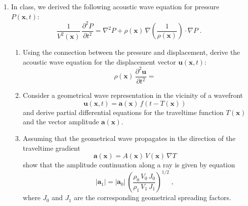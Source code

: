 \begin{enumerate}

\item In class, we derived the following acoustic wave equation for
  pressure $P(\mathbf{x},t)$:
\begin{equation}
{\frac{1}{V^2(\mathbf{x})}}\,{\frac{\partial^2 P}{\partial t^2}} =\nabla^2 P + 
\rho(\mathbf{x})\,
\nabla\left(\frac{1}{\rho(\mathbf{x})}\right) \cdot \nabla P\;.
\label{eq:pwave}
\end{equation}
\begin{enumerate}
\item Using the connection between the pressure and displacement, derive the
acoustic wave equation for the displacement vector
$\mathbf{u}(\mathbf{x},t)$:
\begin{equation}
  \label{eq:uwave}
  \rho(\mathbf{x})\,\frac{\partial^2 \mathbf{u}}{\partial t^2} =
\end{equation}

\item Consider a geometrical wave representation in the vicinity of a wavefront
\begin{equation}
  {\mathbf{u}(\mathbf{x},t)} = \mathbf{a}(\mathbf{x})\,f\left(t-T(\mathbf{x})\right)
  \label{eq:gwave}
\end{equation}
and derive partial differential equations for the traveltime function
$T(\mathbf{x})$ and the vector amplitude $\mathbf{a}(\mathbf{x})$.

\item Assuming that the geometrical wave propagates in the direction
  of the traveltime gradient
\begin{equation}
  {\mathbf{a}(\mathbf{x})} = A(\mathbf{x})\,V(\mathbf{x})\,\nabla T
  \label{eq:vamp}
\end{equation}
show that the amplitude continuation along a ray is given by equation 
\begin{equation}
  \label{eq:avj}
  \left|\mathbf{a}_1\right| = \left|\mathbf{a}_0\right|\,
  \left(\frac{\rho_0\,V_0\,J_0}{\rho_1\,V_1\,J_1}\right)^{1/2}\;, 
\end{equation}
where $J_0$ and $J_1$ are the corresponding geometrical spreading factors.

\end{enumerate}


\end{enumerate}
